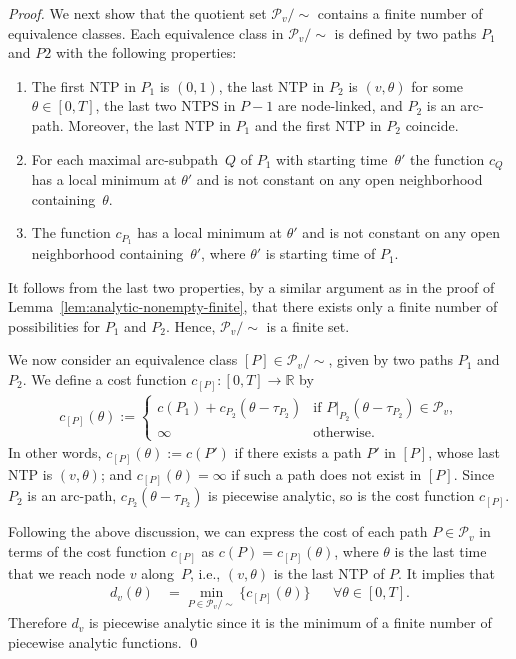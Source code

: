 \documentclass{svjour3}                     \smartqed
\newcommand{\rr}{\ensuremath{\mathbb{R}}}
\begin{document}
\begin{proof}
We next show that the quotient set $\mathcal{P}_v/\sim$ contains a finite number of equivalence classes. Each equivalence class in $\mathcal{P}_v/\sim$ is defined by two paths $P_1$ and $P2$ with the following properties:
\begin{enumerate}[label = (\theenumi)]
\item\label{it:p1} The first NTP in $P_1$ is $(0,1)$, the last NTP in $P_2$ is $(v,\theta)$ for some $\theta\in [0,T]$, the last two NTPS in $P-1$ are node-linked, and $P_2$ is an arc-path. Moreover, the last NTP in $P_1$ and the first NTP in $P_2$ coincide.  
\item\label{it:p2}  For each maximal arc-subpath~$Q$ of $P_1$ with starting time~$\theta'$ the function $c_{Q}$ has a local minimum at $\theta'$ and is not constant on any open neighborhood containing~$\theta$. 
\item\label{it:p3}  The function $c_{P_1}$ has a local minimum at $\theta'$ and is not constant on any open neighborhood containing~$\theta'$, where $\theta'$ is starting time of $P_1$.
\end{enumerate}
It follows from the last two properties, by a similar argument as in the proof of Lemma~\ref{lem:analytic-nonempty-finite}, that there exists only a finite number of possibilities for $P_1$ and $P_2$. Hence, $\mathcal{P}_v/\sim$ is a finite set.



We now consider an equivalence class $[P]\in \mathcal{P}_v/\sim$, given by two paths $P_1$ and $P_2$. We define a cost function $c_{[P]}:[0,T]\rightarrow \rr$ by
  \begin{align*}
    c_{[P]}(\theta) := \begin{cases}
                                c(P_1) + c_{P_2}(\theta-\tau_{P_2}) & \text{if  $P|_{P_2}(\theta-\tau_{P_2})\in \mathcal{P}_v$}, \\
                                \infty & \text{otherwise}.
                              \end{cases}
  \end{align*}
In other words, $c_{[P]}(\theta):=c(P')$ if there exists a path $P'$ in $[P]$, whose last NTP is $(v,\theta)$; and $c_{[P]}(\theta)=\infty$ if such a path does not exist in $[P]$. Since $P_2$ is an arc-path, $c_{P_2}(\theta-\tau_{P_2})$ is piecewise analytic, so is the cost function $ c_{[P]}$.

Following the above discussion, we can express the cost of each path $P\in \mathcal{P}_v$ in terms of the cost function $c_{[P]}$ as $c(P) = c_{[P]}(\theta)$, where $\theta$ is the last time that we reach node $v$ along~$P$, i.e., $(v,\theta)$ is the last NTP of $P$. It implies that 
\begin{align*}
d_v(\theta) &= \min_{P\in \mathcal{P}_v/\sim}\{c_{[P]}(\theta)\} &&\forall \theta\in [0,T].
\end{align*}
Therefore $d_v$ is piecewise analytic since it is the minimum of a finite number of piecewise analytic functions.
  \qed 
\end{proof}
\end{document}
